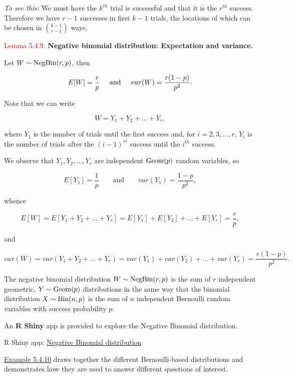 \documentclass[
]{book}
\begin{document}
\emph{To see this:} We must have the \(k^{th}\) trial is successful and that it is the \(r^{th}\) success. Therefore we have \(r-1\) successes in first \(k-1\) trials, the locations of which can be chosen in \(\binom{k-1}{r-1}\) ways.

\leavevmode{}%
\textcolor{red}{Lemma 5.4.9.}
{\textbf{Negative binomial distribution: Expectation and variance.}}

Let \(W \sim {\rm Neg Bin} (r,p)\), then

\[ E[W]= \frac{r}{p} \hspace{0.5cm} \mbox{and} \hspace{0.5cm} var(W) =  \frac{r(1-p)}{p^2}. \]

Note that we can write

\[
W = Y_{1} + Y_{2} + \ldots + Y_{r},
\]

where \(Y_1\) is the number of trials until the first success and, for \(i=2,3,\dots,r\), \(Y_i\) is the number of trials after the \((i-1)^{st}\) success until the \(i^{th}\) success.

We observe that \(Y_1, Y_2,\dots,Y_r\) are independent \({\rm Geom}(p)\) random variables, so

\[
E[Y_1]= \frac{1}{p} \qquad\mbox{and}\qquad var(Y_1)= \frac{1-p}{p^2},
\]

whence

\[
E[W] = E[Y_{1} + Y_{2} +\ldots + Y_{r}] =E[Y_{1}]+E[Y_{2}]+\ldots+E[Y_{r}]  = \frac{r}{p},
\]

and

\[
var(W) = var(Y_{1} + Y_{2} +\ldots +Y_{r}) =var(Y_{1})+var(Y_{2})+\ldots+var(Y_{r}) = \frac{r(1-p)}{p^{2}}.
\]

\hfill\break

The negative binomial distribution \(W \sim {\rm Neg Bin} (r,p)\) is the sum of \(r\) independent geometric, \(Y \sim {\rm Geom} (p)\) distributions in the same way that the binomial distribution \(X \sim {\rm Bin} (n,p)\) is the sum of \(n\) independent Bernoulli random variables with success probability \(p\).

An \textbf{R Shiny} app is provided to explore the Negative Binomial distribution.

R Shiny app: \href{https://shiny-new.maths.nottingham.ac.uk/pmzpn/NegBin/}{Negative Binomial distribution}

\protect\hyperlink{rv:exer:crazy_golf}{Example 5.4.10} draws together the different Bernoulli-based distributions and demonstrates how they are used to answer different questions of interest.
\end{document}
